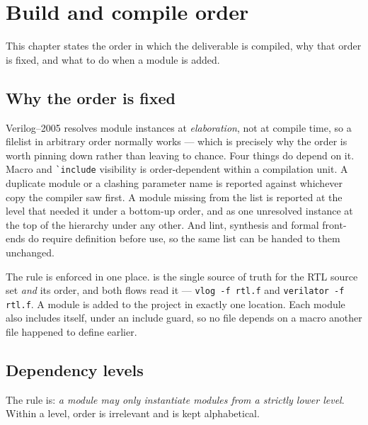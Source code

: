 \chapter{Build and compile order}
\label{ch:buildorder}

This chapter states the order in which the deliverable is compiled, why that
order is fixed, and what to do when a module is added.

\section{Why the order is fixed}

Verilog--2005 resolves module instances at \emph{elaboration}, not at compile
time, so a filelist in arbitrary order normally works --- which is precisely why
the order is worth pinning down rather than leaving to chance. Four things do
depend on it. Macro and \verb|`include| visibility is order-dependent within a
compilation unit. A duplicate module or a clashing parameter name is reported
against whichever copy the compiler saw first. A module missing from the list is
reported at the level that needed it under a bottom-up order, and as one
unresolved instance at the top of the hierarchy under any other. And lint,
synthesis and formal front-ends do require definition before use, so the same
list can be handed to them unchanged.

\begin{rtlnote}
The rule is enforced in one place.  is the single source of
truth for the RTL source set \emph{and} its order, and both flows read it ---
\texttt{vlog -f rtl.f} and \texttt{verilator -f rtl.f}. A module is added to the
project in exactly one location. Each module also includes 
itself, under an include guard, so no file depends on a macro another file
happened to define earlier.
\end{rtlnote}

\section{Dependency levels}

The rule is: \emph{a module may only instantiate modules from a strictly lower
level}. Within a level, order is irrelevant and is kept alphabetical.

